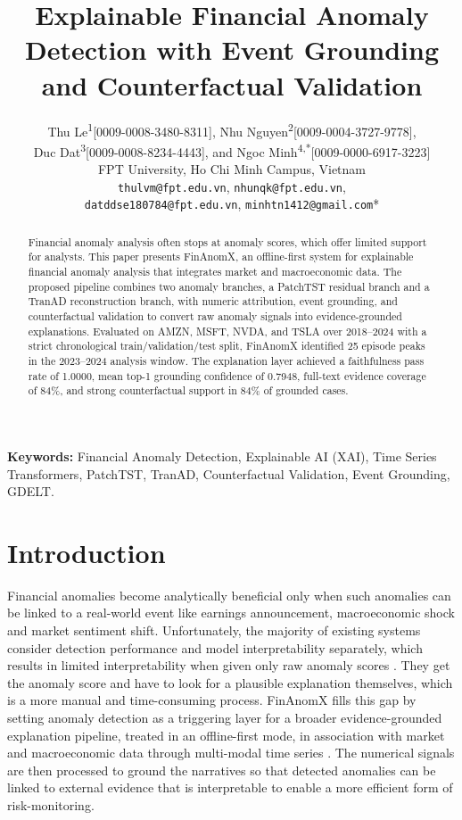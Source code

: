 \documentclass[11pt,a4paper,twoside]{article}
\title{\textbf{Explainable Financial Anomaly Detection with Event Grounding and Counterfactual Validation}}
\author{%
\begin{tabular}{c}
Thu Le\textsuperscript{1}[0009-0008-3480-8311], Nhu Nguyen\textsuperscript{2}[0009-0004-3727-9778],\\
Duc Dat\textsuperscript{3}[0009-0008-8234-4443], and Ngoc Minh\textsuperscript{4,*}[0009-0000-6917-3223]\\[0.45em]
FPT University, Ho Chi Minh Campus, Vietnam\\[0.25em]
\small\texttt{thulvm@fpt.edu.vn}, \texttt{nhunqk@fpt.edu.vn},\\
\small\texttt{datddse180784@fpt.edu.vn}, \texttt{minhtn1412@gmail.com}*
\end{tabular}
}
\date{}
\begin{document}
\maketitle
\thispagestyle{empty}
\begin{abstract}
Financial anomaly analysis often stops at anomaly scores, which offer limited support for analysts. This paper presents FinAnomX, an offline-first system for explainable financial anomaly analysis that integrates market and macroeconomic data. The proposed pipeline combines two anomaly branches, a PatchTST residual branch and a TranAD reconstruction branch, with numeric attribution, event grounding, and counterfactual validation to convert raw anomaly signals into evidence-grounded explanations. Evaluated on AMZN, MSFT, NVDA, and TSLA over 2018--2024 with a strict chronological train/validation/test split, FinAnomX identified 25 episode peaks in the 2023--2024 analysis window. The explanation layer achieved a faithfulness pass rate of 1.0000, mean top-1 grounding confidence of 0.7948, full-text evidence coverage of 84\%, and strong counterfactual support in 84\% of grounded cases.
\end{abstract}

\noindent\textbf{Keywords:} Financial Anomaly Detection, Explainable AI (XAI), Time Series Transformers, PatchTST, TranAD, Counterfactual Validation, Event Grounding, GDELT.

\section{Introduction}

Financial anomalies become analytically beneficial only when such anomalies can be linked to a real-world event like earnings announcement, macroeconomic shock and market sentiment shift. Unfortunately, the majority of existing systems consider detection performance and model interpretability separately, which results in limited interpretability when given only raw anomaly scores \cite{xing2025, zhang2025}. They get the anomaly score and have to look for a plausible explanation themselves, which is a more manual and time-consuming process. FinAnomX fills this gap by setting anomaly detection as a triggering layer for a broader evidence-grounded explanation pipeline, treated in an offline-first mode, in association with market and macroeconomic data through multi-modal time series \cite{xing2025, zhang2025}. The numerical signals are then processed to ground the narratives so that detected anomalies can be linked to external evidence that is interpretable to enable a more efficient form of risk-monitoring.
\end{document}
